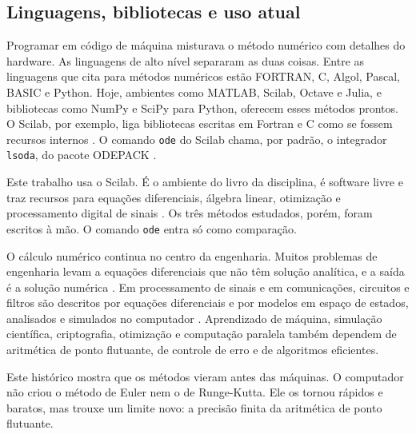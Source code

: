 \subsection{Linguagens, bibliotecas e uso atual}

Programar em código de máquina misturava o método numérico com detalhes do hardware. As linguagens de alto nível separaram as duas coisas. Entre as linguagens que \textcite[p.~14]{aquino2020} cita para métodos numéricos estão FORTRAN, C, Algol, Pascal, BASIC e Python. Hoje, ambientes como MATLAB, Scilab, Octave e Julia, e bibliotecas como NumPy e SciPy para Python, oferecem esses métodos prontos. O Scilab, por exemplo, liga bibliotecas escritas em Fortran e C como se fossem recursos internos \cite[p.~14]{aquino2020}. O comando \texttt{ode} do Scilab chama, por padrão, o integrador \texttt{lsoda}, do pacote ODEPACK \cite[seção~10.7]{aquino2020}.

Este trabalho usa o Scilab. É o ambiente do livro da disciplina, é software livre e traz recursos para equações diferenciais, álgebra linear, otimização e processamento digital de sinais \cite[p.~13--14]{aquino2020}. Os três métodos estudados, porém, foram escritos à mão. O comando \texttt{ode} entra só como comparação.

O cálculo numérico continua no centro da engenharia. Muitos problemas de engenharia levam a equações diferenciais que não têm solução analítica, e a saída é a solução numérica \cite[p.~177]{aquino2020}. Em processamento de sinais e em comunicações, circuitos e filtros são descritos por equações diferenciais e por modelos em espaço de estados, analisados e simulados no computador \cite{lathi2007}. Aprendizado de máquina, simulação científica, criptografia, otimização e computação paralela também dependem de aritmética de ponto flutuante, de controle de erro e de algoritmos eficientes.

Este histórico mostra que os métodos vieram antes das máquinas. O computador não criou o método de Euler nem o de Runge-Kutta. Ele os tornou rápidos e baratos, mas trouxe um limite novo: a precisão finita da aritmética de ponto flutuante.
